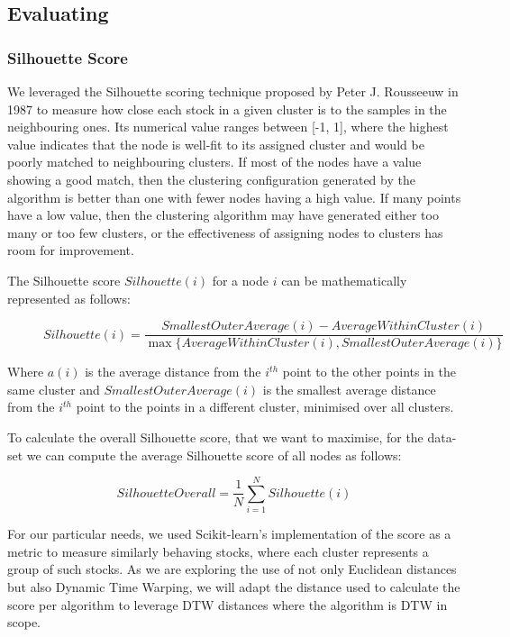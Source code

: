\documentclass[11pt]{article}
\begin{document}
 
\subsection{Evaluating}
\subsubsection{Silhouette Score}
We leveraged the Silhouette scoring technique proposed by Peter J. Rousseeuw \cite{silhouettes} in 1987 to measure how close each stock in a given cluster is to the samples in the neighbouring ones. Its numerical value ranges between [-1, 1], where the highest value indicates that the node is well-fit to its assigned cluster and would be poorly matched to neighbouring clusters. If most of the nodes have a value showing a good match, then the clustering configuration generated by the algorithm is better than one with fewer nodes having a high value. If many points have a low value, then the clustering algorithm may have generated either too many or too few clusters, or the effectiveness of assigning nodes to clusters has room for improvement.

The Silhouette score \( Silhouette(i) \) for a node \( i \) can be mathematically represented as follows:

\begin{figure}[H]
\centering
\begin{equation*}
Silhouette(i) = \frac{SmallestOuterAverage(i) - AverageWithinCluster(i)}{\max\{AverageWithinCluster(i), SmallestOuterAverage(i)\}}
\end{equation*}
\end{figure}

Where \( a(i) \) is the average distance from the \( i^{th} \) point to the other points in the same cluster and \(SmallestOuterAverage(i) \) is the smallest average distance from the \( i^{th} \) point to the points in a different cluster, minimised over all clusters.

To calculate the overall Silhouette score, that we want to maximise, for the data-set we can compute the average Silhouette score of all nodes as follows:

\begin{equation*}
SilhouetteOverall = \frac{1}{N} \sum_{i=1}^{N} Silhouette(i)
\end{equation*}

For our particular needs, we used Scikit-learn's implementation \cite{scikit} of the score as a metric to measure similarly behaving stocks, where each cluster represents a group of such stocks. As we are exploring the use of not only Euclidean distances but also Dynamic Time Warping, we will adapt the distance used to calculate the score per algorithm to leverage DTW distances where the algorithm is DTW in scope.
\end{document}
